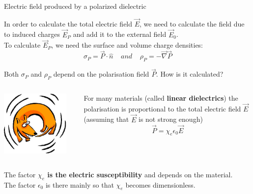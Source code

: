 \begin{frame}{Electric field produced by a polarized dielectric}

In order to calculate the total electric field $\vec{E}$,
we need to calculate the field due to induced charges $\vec{E}_P$ and add it to the external field $\vec{E}_0$.\\

To calculate $\vec{E}_P$, we need the surface and volume charge densities:
\begin{equation*}
   {\sigma}_P = \vec{P} \cdot \hat{n} \;\;\;\; and \;\;\;\;
   {\rho}_P = - \vec{\nabla} \vec{P}
\end{equation*}

Both ${\sigma}_P$ and ${\rho}_P$ depend on the polarisation field $\vec{P}$.
How is it calculated?\\

\begin{columns}
  \begin{column}{0.25\textwidth}
   \begin{center}
     \includegraphics[width=0.90\textwidth]{./images/misc/dog_chasing_tail.jpg}\\
   \end{center}
  \end{column}
  \begin{column}{0.75\textwidth}
    For many materials (called {\bf linear dielectrics}) the polarisation is
    proportional to the total electric field $\vec{E}$ (assuming that $\vec{E}$ is not strong enough)
    \begin{equation*}
       \vec{P} = \chi_{e} \epsilon_0 \vec{E}
    \end{equation*}
  \end{column}
\end{columns}

The factor {\bf $\chi_{e}$ is the electric susceptibility} and depends on the material.\\
The factor $\epsilon_0$ is there mainly so that $\chi_{e}$ becomes dimensionless.\\

\end{frame}

